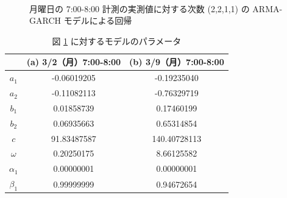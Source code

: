 \documentclass[technicalreport]{ieicej}
\begin{document}
\begin{figure}[tb]
\begin{center}
~
\caption{月曜日の 7:00-8:00 計測の実測値に対する次数 (2,2,1,1) の ARMA-GARCH モデルによる回帰}
\label{norm-reg}
\end{center}
\end{figure}

\begin{table}[tb]
\centering
\caption{図 \ref{norm-reg} に対するモデルのパラメータ}
\label{norm-param}
\begin{tabular}{|c|c|c|}
\hline
&(a) 3/2（月）7:00-8:00&(b) 3/9（月）7:00-8:00\\
\hline
$a_1$&-0.06019205&-0.19235040\\
\hline
$a_2$&-0.11082113&-0.76329719\\
\hline
$b_1$&0.01858739&0.17460199\\
\hline
$b_2$&0.06935663&0.65314854\\
\hline
$c$&91.83487587&140.40728113\\
\hline
$\omega$&0.20250175&8.66125582\\
\hline
$\alpha_1$&0.00000001&0.00000001\\
\hline
$\beta_1$&0.99999999&0.94672654\\
\hline
\end{tabular}
\end{table}
\end{document}
